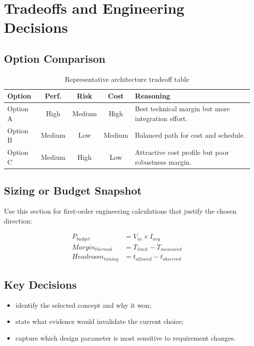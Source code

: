 \section{Tradeoffs and Engineering Decisions}

\subsection{Option Comparison}
\begin{table}[H]
    \centering
    \small
    \begin{tabular}{p{2.5cm} c c c p{3.5cm}}
        \toprule
        \textbf{Option} & \textbf{Perf.} & \textbf{Risk} & \textbf{Cost} & \textbf{Reasoning} \\
        \midrule
        Option A & High & Medium & High & Best technical margin but more integration effort. \\
        Option B & Medium & Low & Medium & Balanced path for cost and schedule. \\
        Option C & Medium & High & Low & Attractive cost profile but poor robustness margin. \\
        \bottomrule
    \end{tabular}
    \caption{Representative architecture tradeoff table}
    \label{tab:tradeoffs}
\end{table}

\subsection{Sizing or Budget Snapshot}
Use this section for first-order engineering calculations that justify the chosen
direction:

\begin{align}
    P_{budget} &= V_{in} \times I_{avg} \\
    Margin_{thermal} &= T_{limit} - T_{measured} \\
    Headroom_{timing} &= t_{allowed} - t_{observed}
\end{align}


\subsection{Key Decisions}
\begin{itemize}
    \item identify the selected concept and why it won;
    \item state what evidence would invalidate the current choice;
    \item capture which design parameter is most sensitive to requirement changes.
\end{itemize}
